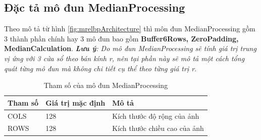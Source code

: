 \subsection{Đặc tả mô đun MedianProcessing}
Theo mô tả từ hình \ref{fig:mrelbpArchitecture} thì môn đun MedianProcessing gồm 3 thành phần chính hay 3 mô đun bao gồm \textbf{Buffer6Rows, ZeroPadding, MedianCalculation}. \textit{\textbf{Lưu ý}: Do mô đun MedianProcessing sẽ tính giá trị trung vị ứng với 3 cửa sổ theo bán kính r, nên tại phần này sẽ mô tả một cách tổng quát từng mô đun mà không chi tiết cụ thể theo từng giá trị r}.
\begin{table}[!ht]
    \centering
    \renewcommand{\arraystretch}{1.3} %
    \begin{tabular}{|p{3cm} p{4cm} p{8cm}|}
        \hline
        \rowcolor{gray!30}
        \textbf{Tham số } & \textbf{Giá trị mặc định}  & \textbf{Mô tả} \\
        \hline
        COLS & 128 & Kích thước độ rộng của ảnh
        \\ \hline
        ROWS & 128 & Kích thước chiều cao của ảnh
        \\
        \hline
    \end{tabular}
    \caption{Tham số của mô đun MedianProcessing}
    \label{tab:paramListMedianProcessing}
\end{table}

